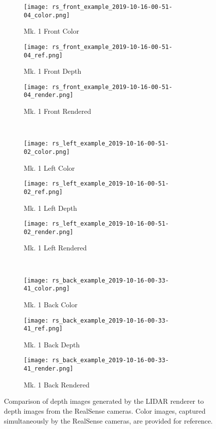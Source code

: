 \begin{figure}
	\centering
	\begin{subfigure}{0.3\textwidth}
		\texttt{[image: rs\_front\_example\_2019-10-16-00-51-04\_color.png]}
		\caption{Mk. 1 Front Color}
		\label{lidar_front_color}
	\end{subfigure}		
	\hfill
	\begin{subfigure}{0.3\textwidth}
		\texttt{[image: rs\_front\_example\_2019-10-16-00-51-04\_ref.png]}
		\caption{Mk. 1 Front Depth}
		\label{lidar_front_ref}		
	\end{subfigure}
	\hfill
	\begin{subfigure}{0.3\textwidth}
		\texttt{[image: rs\_front\_example\_2019-10-16-00-51-04\_render.png]}
		\caption{Mk. 1 Front Rendered}
		\label{lidar_front_render}
	\end{subfigure}
	\\
	\begin{subfigure}{0.3\textwidth}
		\texttt{[image: rs\_left\_example\_2019-10-16-00-51-02\_color.png]}
		\caption{Mk. 1 Left Color}
		\label{lidar_left_color}
	\end{subfigure}		
	\hfill
	\begin{subfigure}{0.3\textwidth}
		\texttt{[image: rs\_left\_example\_2019-10-16-00-51-02\_ref.png]}
		\caption{Mk. 1 Left Depth}
		\label{lidar_left_ref}		
	\end{subfigure}
	\hfill
	\begin{subfigure}{0.3\textwidth}
		\texttt{[image: rs\_left\_example\_2019-10-16-00-51-02\_render.png]}
		\caption{Mk. 1 Left Rendered}
		\label{lidar_left_render}
	\end{subfigure}
	\\
	\begin{subfigure}{0.3\textwidth}
		\texttt{[image: rs\_back\_example\_2019-10-16-00-33-41\_color.png]}
		\caption{Mk. 1 Back Color}
		\label{lidar_back_color}
	\end{subfigure}		
	\hfill
	\begin{subfigure}{0.3\textwidth}
		\texttt{[image: rs\_back\_example\_2019-10-16-00-33-41\_ref.png]}
		\caption{Mk. 1 Back Depth}
		\label{lidar_back_ref}		
	\end{subfigure}
	\hfill
	\begin{subfigure}{0.3\textwidth}
		\texttt{[image: rs\_back\_example\_2019-10-16-00-33-41\_render.png]}
		\caption{Mk. 1 Back Rendered}
		\label{lidar_back_render}
	\end{subfigure}		
	\caption[LIDAR renderer depth image comparison]{Comparison of depth images generated by the LIDAR renderer to depth images from the RealSense cameras. Color images, captured simultaneously by the RealSense cameras, are provided for reference.}
	\label{lidar_renderer_images}
\end{figure}

